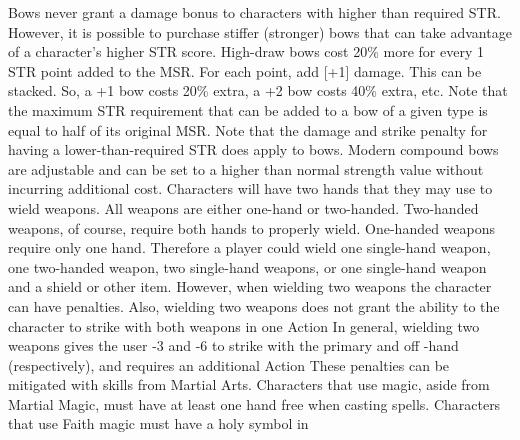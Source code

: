 \documentclass[twoside]{book}
\begin{document}
   Bows never grant a damage bonus to characters with
               higher than required STR. However, it is possible to
               purchase stiffer (stronger) bows that can take advantage
               of a character’s higher STR score. High-draw bows
               cost 20\% more for every 1 STR point added to the MSR. For
               each point, add [+1] damage. This can be stacked. So, a +1
               bow costs 20\% extra, a +2 bow costs 40\% extra, etc. Note
               that the maximum STR requirement that can be added to a
               bow of a given type is equal to half of its original MSR.
               Note that the damage and strike penalty for having a
               lower-than-required STR does apply to bows. Modern
               compound bows are adjustable and can be set to a higher
               than normal strength value without incurring additional
               cost.  Characters will have two hands that they may use to
               wield weapons. All weapons are either one-hand or
               two-handed. Two-handed weapons, of course, require both
               hands to properly wield. One-handed weapons require only
               one hand. Therefore a player could wield one single-hand
               weapon, one two-handed weapon, two single-hand weapons, or
               one single-hand weapon and a shield or other item.
               However, when wielding two weapons the character can have
               penalties. Also, wielding two weapons does not grant the
               ability to the character to strike with both weapons in
               one Action In general, wielding two weapons gives the user
               -3 and -6 to strike with the primary and off -hand
               (respectively), and requires an additional Action These
               penalties can be mitigated with skills from Martial Arts.
                Characters that use magic, aside from Martial Magic,
               must have at least one hand free when casting spells.
               Characters that use Faith magic must have a holy symbol in
\end{document}
